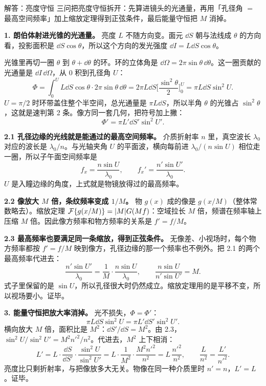 \begin{exam}{解答：亮度守恒}
三问把亮度守恒拆开：先算进镜头的光通量，再用「孔径角 $=$ 最高空间频率」加上缩放定理得到正弦条件，最后能量守恒把 $M$ 消掉。

\textbf{1. 朗伯体射进光锥的光通量。}
亮度 $L$ 不随方向变。面元 $\dd S$ 朝与法线成 $\theta$ 的方向看，投影面积是 $\dd S\cos\theta$，所以这个方向的发光强度 $\dd I=L\dd S\cos\theta$。

光锥里再切一圈 $\theta$ 到 $\theta+\dd\theta$ 的环。环的立体角是 $\dd\Omega=2\pi\sin\theta\,\dd\theta$。这一圈贡献的光通量是 $\dd I\,\dd\Omega$，从 $0$ 积到孔径角 $U$：
\[
\Phi=\int_0^U L\dd S\cos\theta\cdot 2\pi\sin\theta\,\dd\theta
=2\pi L\dd S\Big[\frac{\sin^2\theta}{2}\Big]_0^U
=\pi L\dd S\sin^2 U .
\]
$U=\pi/2$ 时环带盖住整个半空间，总光通量是 $\pi L\dd S$，所以半角 $\theta$ 的光锥占 $\sin^2\theta$，这就是速判第 2 条。像方同一套几何，把符号加上撇：
\[
\boxed{\Phi'=\pi L'\dd S'\sin^2 U'} .
\]

\textbf{2.1 孔径边缘的光线就是能通过的最高空间频率。}
介质折射率 $n$ 里，真空波长 $\lambda_0$ 对应的波长是 $\lambda_0/n$。与光轴夹角 $U$ 的平面波，横向每前进 $\lambda_0/(n\sin U)$ 相位走一圈，所以子午面空间频率是
\[
f_x=\frac{n\sin U}{\lambda_0},\qquad f_x'=\frac{n'\sin U'}{\lambda_0}.
\]
$U$ 是入瞳边缘的角度，上式就是物镜放得过的最高频率。

\textbf{2.2 像放大 $M$ 倍，条纹频率变成 $1/M$。}
物 $g(x)$ 成的像是 $g(x/M)$（整体常数略去）。缩放定理 $\mathcal{F}\{g(x/M)\}=|M|G(Mf)$：空域拉长 $M$ 倍，频谱在频率轴上压缩 $M$ 倍。因此像方频率和物方频率的关系是 $f'=f/M$。

\textbf{2.3 最高频率也要满足同一条缩放，得到正弦条件。}
无像差、小视场时，每个物方频率都按 $f'=f/M$ 映到像方，孔径边缘的那一个频率也不例外。把 2.1 的两个最高频率代进去：
\[
\frac{n'\sin U'}{\lambda_0}=\frac1M\cdot\frac{n\sin U}{\lambda_0},
\qquad\boxed{\frac{n\sin U}{n'\sin U'}=M} .
\]
式子里保留的是 $\sin U$，所以孔径很大时仍然成立。缩放定理用的是平移不变，所以视场要小。证毕。

\textbf{3. 能量守恒把放大率消掉。}
光不损失，$\Phi=\Phi'$：
\[
\pi L\dd S\sin^2 U=\pi L'\dd S'\sin^2 U' .
\]
横向放大 $M$ 倍，面积比是 $M^2$：$\dd S'/\dd S=M^2$。由 2.3，$\sin^2 U/\sin^2 U'=M^2 n'^2/n^2$。代进去，$M^2$ 上下相消：
\[
L'=L\cdot\frac{\dd S}{\dd S'}\cdot\frac{\sin^2 U}{\sin^2 U'}
=L\cdot\frac{1}{M^2}\cdot\frac{M^2 n'^2}{n^2}
=L\,\frac{n'^2}{n^2},
\qquad\boxed{\frac{L}{n^2}=\frac{L'}{n'^2}} .
\]
亮度比只剩折射率，与把像放多大无关。物像在同一种介质里时 $n'=n$，$L'=L$。证毕。
\end{exam}

